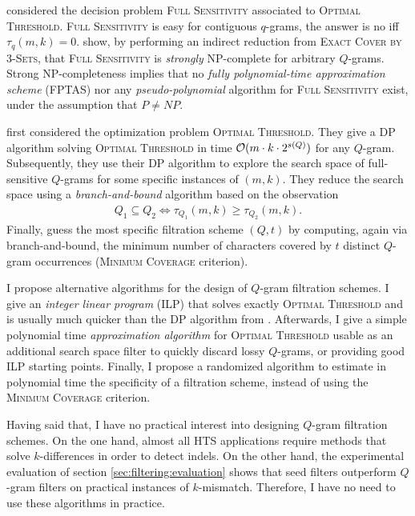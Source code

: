 \cite{Nicolas2005} considered the decision problem \textsc{Full Sensitivity} associated to \textsc{Optimal Threshold}.
\textsc{Full Sensitivity} is easy for contiguous $q$-grams, \ie the answer is no iff $\tau_q(m,k) = 0$.
\citeauthor{Nicolas2005} show, by performing an indirect reduction from \textsc{Exact Cover by 3-Sets}, that \textsc{Full Sensitivity} is \emph{strongly} NP-complete for arbitrary $Q$-grams.
Strong NP-completeness implies that no \emph{fully polynomial-time approximation scheme} (FPTAS) nor any \emph{pseudo-polynomial} algorithm for \textsc{Full Sensitivity} exist, under the assumption that $P \neq NP$.

\cite{Burkhardt2001} first considered the optimization problem \textsc{Optimal Threshold}.
They give a DP algorithm solving \textsc{Optimal Threshold} in time $\mathcal{O}(m \cdot k \cdot 2^{s(Q)})$ for any $Q$-gram.
Subsequently, they use their DP algorithm to explore the search space of full-sensitive $Q$-grams for some specific instances of $(m,k)$.
They reduce the search space using a \emph{branch-and-bound} algorithm based on the observation
\begin{eqnarray}
Q_1 \subseteq Q_2 \iff \tau_{Q_1}(m,k) \geq \tau_{Q_2}(m,k).
\end{eqnarray}
Finally, \citeauthor{Burkhardt2001} guess the most specific filtration scheme $(Q,t)$ by computing, again via branch-and-bound, the minimum number of characters covered by $t$ distinct $Q$-gram occurrences (\textsc{Minimum Coverage} criterion).

I propose alternative algorithms for the design of $Q$-gram filtration schemes.
I give an \emph{integer linear program} (ILP) that solves exactly \textsc{Optimal Threshold} and is usually much quicker than the DP algorithm from \citep{Burkhardt2001}.
Afterwards, I give a simple polynomial time \emph{approximation algorithm} for \textsc{Optimal Threshold} usable as an additional search space filter to quickly discard lossy $Q$-grams, or providing good ILP starting points.
Finally, I propose a randomized algorithm to estimate in polynomial time the specificity of a filtration scheme, instead of using the \textsc{Minimum Coverage} criterion.

Having said that, I have no practical interest into designing $Q$-gram filtration schemes.
On the one hand, almost all HTS applications require methods that solve $k$-differences in order to detect indels.
On the other hand, the experimental evaluation of section \ref{sec:filtering:evaluation} shows that seed filters outperform $Q$-gram filters on practical instances of $k$-mismatch.
Therefore, I have no need to use these algorithms in practice.

